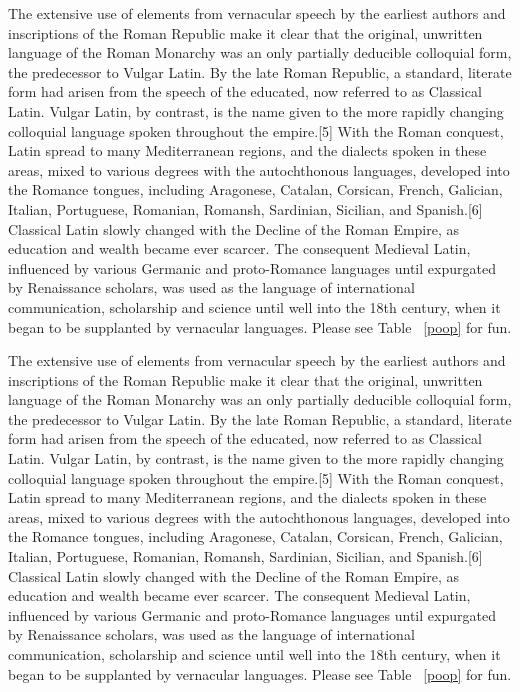 \documentclass{paper}
\begin{document}
The extensive use of elements from vernacular speech by the earliest authors and inscriptions of the Roman Republic make it clear that the original, unwritten language of the Roman Monarchy was an only partially deducible colloquial form, the predecessor to Vulgar Latin. By the late Roman Republic, a standard, literate form had arisen from the speech of the educated, now referred to as Classical Latin. Vulgar Latin, by contrast, is the name given to the more rapidly changing colloquial language spoken throughout the empire.[5] With the Roman conquest, Latin spread to many Mediterranean regions, and the dialects spoken in these areas, mixed to various degrees with the autochthonous languages, developed into the Romance tongues, including Aragonese, Catalan, Corsican, French, Galician, Italian, Portuguese, Romanian, Romansh, Sardinian, Sicilian, and Spanish.[6] Classical Latin slowly changed with the Decline of the Roman Empire, as education and wealth became ever scarcer. The consequent Medieval Latin, influenced by various Germanic and proto-Romance languages until expurgated by Renaissance scholars, was used as the language of international communication, scholarship and science until well into the 18th century, when it began to be supplanted by vernacular languages. Please see Table ~\ref{poop} for fun.


The extensive use of elements from vernacular speech by the earliest authors and inscriptions of the Roman Republic make it clear that the original, unwritten language of the Roman Monarchy was an only partially deducible colloquial form, the predecessor to Vulgar Latin. By the late Roman Republic, a standard, literate form had arisen from the speech of the educated, now referred to as Classical Latin. Vulgar Latin, by contrast, is the name given to the more rapidly changing colloquial language spoken throughout the empire.[5] With the Roman conquest, Latin spread to many Mediterranean regions, and the dialects spoken in these areas, mixed to various degrees with the autochthonous languages, developed into the Romance tongues, including Aragonese, Catalan, Corsican, French, Galician, Italian, Portuguese, Romanian, Romansh, Sardinian, Sicilian, and Spanish.[6] Classical Latin slowly changed with the Decline of the Roman Empire, as education and wealth became ever scarcer. The consequent Medieval Latin, influenced by various Germanic and proto-Romance languages until expurgated by Renaissance scholars, was used as the language of international communication, scholarship and science until well into the 18th century, when it began to be supplanted by vernacular languages. Please see Table ~\ref{poop} for fun.
\end{document}
